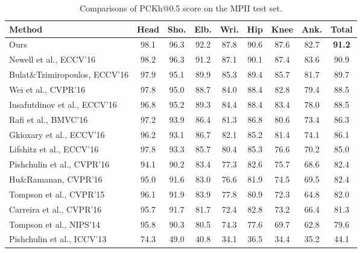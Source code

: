 \documentclass[journal ]{IEEEtran}
\begin{document}
\begin{table*}[t]
	\centering 
	\footnotesize
	\tabcolsep=0.2cm
	\begin{tabular}{l c c c c c c c c }
		\hline 
		Method & Head & Sho. & Elb. & Wri. & Hip & Knee & Ank. & Total \\ [0.1ex]
		\hline 
Ours  &98.1  & 96.3  & 92.2  & 87.8  & 90.6  & 87.6 & 82.7 & \textbf{91.2} \\
		\hline
Newell et al., ECCV'16\cite{newell2016stacked} &{98.2} &96.3 &91.2 &87.1 &90.1 &87.4 &83.6 &90.9 \\
		Bulat\&Tzimiropoulos, ECCV'16 \cite{bulat2016human} &97.9 &{95.1} &89.9 &85.3 &89.4 &85.7 &81.7 &89.7\\  
		Wei et al., CVPR'16 \cite{wei2016convolutional} &97.8 &95.0 &88.7 &{84.0} &88.4 &82.8 &79.4 &88.5 \\  
		Insafutdinov et al., ECCV'16 \cite{insafutdinov2016deepercut} &96.8 &95.2 &89.3 &84.4 &88.4 &83.4 &78.0 &88.5 \\  
		Rafi et al., BMVC'16 \cite{rafi2016efficient} &97.2 &93.9 &86.4 &81.3 &86.8 &80.6 &73.4 &86.3 \\  
		Gkioxary et al., ECCV'16 \cite{gkioxari2016chained} &96.2 &93.1 &86.7 &82.1 &85.2 &81.4 &74.1 &86.1 \\  
		Lifshitz et al., ECCV'16 \cite{lifshitz2016human} &97.8 &93.3 &85.7 &80.4 &85.3 &76.6 &70.2 &85.0 \\  
		Pishchulin et al., CVPR'16 \cite{pishchulin2016deepcut} &94.1 &90.2 &83.4 &77.3 &82.6 &75.7 &68.6 &82.4 \\
		Hu\&Ramanan, CVPR'16 \cite{hu2016bottom} &95.0 &91.6 &83.0 &76.6 &81.9 &74.5 &69.5 &82.4 \\  
		Tompson et al., CVPR'15 \cite{tompson2015efficient} &96.1 &91.9 &83.9 &77.8 &80.9 &72.3 &64.8 &82.0  \\  
		Carreira et al., CVPR'16 \cite{carreira2016human} &95.7 &91.7 &81.7 &72.4 &82.8 &73.2 &66.4 &81.3 \\  
		Tompson et al., NIPS'14 \cite{tompson2014joint} &95.8 &90.3 &80.5 &74.3 &77.6 &69.7 &62.8 &79.6 \\  
		Pishchulin et al., ICCV'13 \cite{pishchulin2013strong}  &74.3 &49.0 &40.8 &34.1 &36.5 &34.4 &35.2 &44.1 \\
		\hline	\hline
	\end{tabular}
	\caption{Comparisons of PCKh@0.5 score on the MPII test set.}
	\label{table:MPI-results}
\end{table*}
\end{document}
